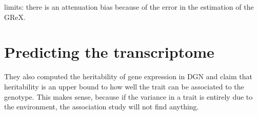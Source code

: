 \documentclass[../main.tex]{subfiles}
\begin{document}


limits: there is an attenuation bias because of the error in the 
estimation of the GReX.



\section{Predicting the transcriptome}

They also computed the heritability of gene expression in DGN and claim 
that heritability  is an upper 
bound to how well the trait can be associated to the genotype. This 
makes sense, because if the variance in a trait is entirely due to the 
environment, the association study will not find anything.
\end{document}
